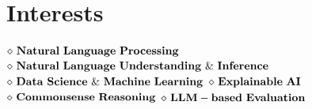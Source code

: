 \section{Interests}
{\centering
$\diamond {\bf \ Natural \ Language \ Processing}$
$\diamond {\bf \ Natural \ Language \ Understanding \ \& \  Inference}$
$\diamond {\bf \ Data \ Science \ \& \ Machine \ Learning}$
$\diamond {\bf \ Explainable\ AI}$ 
$\diamond {\bf \ Commonsense \ Reasoning}$
$\diamond {\bf \ LLM-based \ Evaluation}$ \par}
